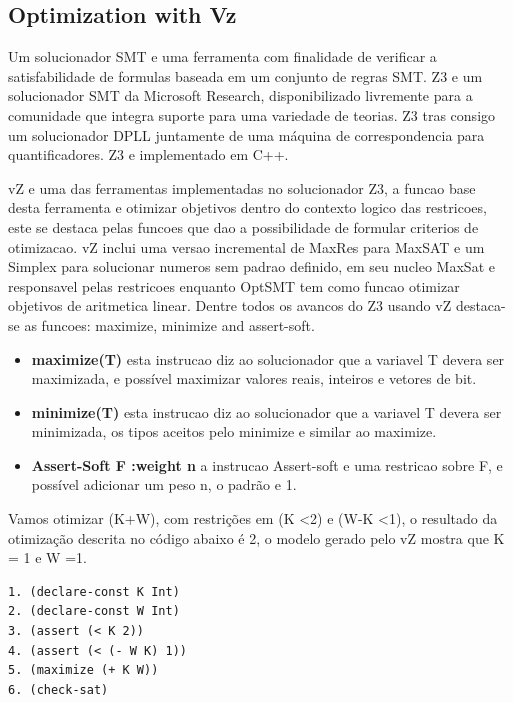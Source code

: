 \subsection{Optimization with Vz}
Um solucionador SMT e uma ferramenta com finalidade de verificar a satisfabilidade de formulas baseada em um conjunto de regras SMT. Z3 e um solucionador SMT da Microsoft Research, disponibilizado livremente para a comunidade que integra suporte para uma variedade de teorias. Z3 tras consigo um solucionador DPLL juntamente de uma máquina de correspondencia para quantificadores. Z3 e implementado em C++.

vZ e uma das ferramentas implementadas no solucionador Z3, a funcao base desta ferramenta e otimizar objetivos dentro do contexto logico das restricoes, este se destaca pelas funcoes que dao a possibilidade de formular criterios de otimizacao. 
vZ inclui uma versao incremental de MaxRes para MaxSAT e um Simplex para solucionar numeros sem padrao definido, em seu nucleo MaxSat e responsavel pelas restricoes enquanto OptSMT tem como funcao otimizar objetivos de aritmetica linear.
Dentre todos os avancos do Z3 usando vZ destaca-se as funcoes: maximize, minimize and assert-soft.
\begin{itemize}
\item{\textbf{maximize(T)}
esta instrucao diz ao solucionador que a variavel T devera ser maximizada, e possível maximizar valores reais, inteiros e vetores de bit.}
\item{\textbf{minimize(T)}
esta instrucao diz ao solucionador que a variavel T devera ser minimizada, os tipos aceitos pelo minimize e similar ao maximize.}
\item{\textbf{Assert-Soft F :weight n}
a instrucao Assert-soft e uma restricao sobre F, e possível adicionar um peso n, o padrão e 1.} 
\end{itemize}

Vamos otimizar (K+W), com restrições em (K \textless 2) e (W-K \textless 1), o resultado da otimização descrita no código abaixo é 2, o modelo gerado pelo vZ mostra que K = 1 e W =1.

\begin{lstlisting}
1. (declare-const K Int) 
2. (declare-const W Int)
3. (assert (< K 2)) 
4. (assert (< (- W K) 1))
5. (maximize (+ K W)) 
6. (check-sat)
\end{lstlisting}


